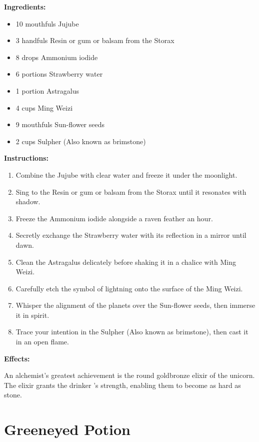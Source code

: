 \documentclass{article}
\begin{document}
\textbf{Ingredients:}

\begin{itemize}
  \item 10 mouthfuls Jujube
  \item 3 handfuls Resin or gum or balsam from the Storax
  \item 8 drops Ammonium iodide
  \item 6 portions Strawberry water
  \item 1 portion Astragalus
  \item 4 cups Ming Weizi
  \item 9 mouthfuls Sun-flower seeds
  \item 2 cups Sulpher (Also known as brimstone)
\end{itemize}

\textbf{Instructions:}

\begin{enumerate}
  \item Combine the Jujube with clear water and freeze it under the moonlight.
  \item Sing to the Resin or gum or balsam from the Storax until it resonates with shadow.
  \item Freeze the Ammonium iodide alongside a raven feather an hour.
  \item Secretly exchange the Strawberry water with its reflection in a mirror until dawn.
  \item Clean the Astragalus delicately before shaking it in a chalice with Ming Weizi.
  \item Carefully etch the symbol of lightning onto the surface of the Ming Weizi.
  \item Whisper the alignment of the planets over the Sun-flower seeds, then immerse it in spirit.
  \item Trace your intention in the Sulpher (Also known as brimstone), then cast it in an open flame.
\end{enumerate}

\textbf{Effects:}

An alchemist's greatest achievement is the round goldbronze elixir of the unicorn. The elixir grants the drinker 's strength, enabling them to become as hard as stone.

\newpage
\section*{Greeneyed Potion}
\end{document}

